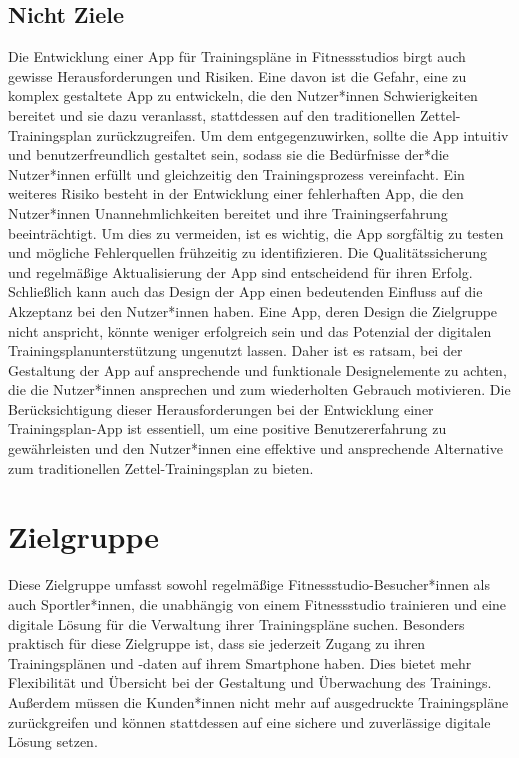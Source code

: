 \subsection{Nicht Ziele}
Die Entwicklung einer App für Trainingspläne in Fitnessstudios birgt auch gewisse Herausforderungen und Risiken. Eine davon ist die Gefahr, eine zu komplex gestaltete App zu entwickeln, die den Nutzer*innen Schwierigkeiten bereitet und sie dazu veranlasst, stattdessen auf den traditionellen Zettel-Trainingsplan zurückzugreifen. Um dem entgegenzuwirken, sollte die App intuitiv und benutzerfreundlich gestaltet sein, sodass sie die Bedürfnisse der*die Nutzer*innen erfüllt und gleichzeitig den Trainingsprozess vereinfacht.
\newline
\newline
Ein weiteres Risiko besteht in der Entwicklung einer fehlerhaften App, die den Nutzer*innen Unannehmlichkeiten bereitet und ihre Trainingserfahrung beeinträchtigt. Um dies zu vermeiden, ist es wichtig, die App sorgfältig zu testen und mögliche Fehlerquellen frühzeitig zu identifizieren. Die Qualitätssicherung und regelmäßige Aktualisierung der App sind entscheidend für ihren Erfolg.
\newline
\newline
Schließlich kann auch das Design der App einen bedeutenden Einfluss auf die Akzeptanz bei den Nutzer*innen haben. Eine App, deren Design die Zielgruppe nicht anspricht, könnte weniger erfolgreich sein und das Potenzial der digitalen Trainingsplanunterstützung ungenutzt lassen. Daher ist es ratsam, bei der Gestaltung der App auf ansprechende und funktionale Designelemente zu achten, die die Nutzer*innen ansprechen und zum wiederholten Gebrauch motivieren.
\newline
\newline
Die Berücksichtigung dieser Herausforderungen bei der Entwicklung einer Trainingsplan-App ist essentiell, um eine positive Benutzererfahrung zu gewährleisten und den Nutzer*innen eine effektive und ansprechende Alternative zum traditionellen Zettel-Trainingsplan zu bieten.

\newpage
\section{Zielgruppe}
Diese Zielgruppe umfasst sowohl regelmäßige Fitnessstudio-Besucher*innen als auch Sportler*innen, 
die unabhängig von einem Fitnessstudio trainieren und eine digitale Lösung für die Verwaltung 
ihrer Trainingspläne suchen. Besonders praktisch für diese Zielgruppe ist, dass sie jederzeit 
Zugang zu ihren Trainingsplänen und -daten auf ihrem Smartphone haben. Dies bietet mehr Flexibilität 
und Übersicht bei der Gestaltung und Überwachung des Trainings. Außerdem müssen die Kunden*innen nicht mehr 
auf ausgedruckte Trainingspläne zurückgreifen und können stattdessen auf eine sichere und zuverlässige 
digitale Lösung setzen.

